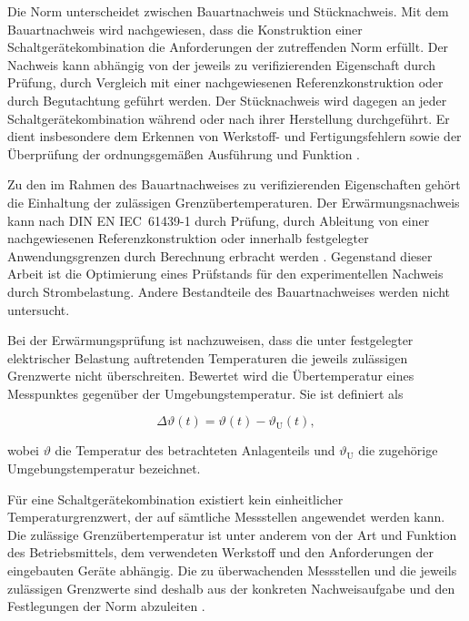 Die Norm unterscheidet zwischen Bauartnachweis und Stücknachweis. Mit dem
Bauartnachweis wird nachgewiesen, dass die Konstruktion einer
Schaltgerätekombination die Anforderungen der zutreffenden Norm erfüllt. Der
Nachweis kann abhängig von der jeweils zu verifizierenden Eigenschaft durch
Prüfung, durch Vergleich mit einer nachgewiesenen Referenzkonstruktion oder
durch Begutachtung geführt werden. Der Stücknachweis wird dagegen an jeder
Schaltgerätekombination während oder nach ihrer Herstellung durchgeführt. Er
dient insbesondere dem Erkennen von Werkstoff- und Fertigungsfehlern sowie der
Überprüfung der ordnungsgemäßen Ausführung und Funktion
\parencite[Abschn.~3.9.1 und 3.9.2]{din_en_61439_1}.

Zu den im Rahmen des Bauartnachweises zu verifizierenden Eigenschaften gehört
die Einhaltung der zulässigen Grenzübertemperaturen. Der Erwärmungsnachweis
kann nach DIN EN IEC~61439-1 durch Prüfung, durch Ableitung von einer
nachgewiesenen Referenzkonstruktion oder innerhalb festgelegter
Anwendungsgrenzen durch Berechnung erbracht werden
\parencite[Abschn.~10.10.1]{din_en_61439_1}. Gegenstand dieser Arbeit ist die
Optimierung eines Prüfstands für den experimentellen Nachweis durch
Strombelastung. Andere Bestandteile des Bauartnachweises werden nicht
untersucht.

Bei der Erwärmungsprüfung ist nachzuweisen, dass die unter festgelegter
elektrischer Belastung auftretenden Temperaturen die jeweils zulässigen
Grenzwerte nicht überschreiten. Bewertet wird die Übertemperatur eines
Messpunktes gegenüber der Umgebungstemperatur. Sie ist definiert als

\begin{equation}
  \Delta\vartheta(t)
  =
  \vartheta(t)-\vartheta_{\mathrm{U}}(t),
  \label{eq:uebertemperatur}
\end{equation}

wobei \(\vartheta\) die Temperatur des betrachteten Anlagenteils und
\(\vartheta_{\mathrm{U}}\) die zugehörige Umgebungstemperatur bezeichnet.

Für eine Schaltgerätekombination existiert kein einheitlicher
Temperaturgrenzwert, der auf sämtliche Messstellen angewendet werden kann. Die
zulässige Grenzübertemperatur ist unter anderem von der Art und Funktion des
Betriebsmittels, dem verwendeten Werkstoff und den Anforderungen der
eingebauten Geräte abhängig. Die zu überwachenden Messstellen und die jeweils
zulässigen Grenzwerte sind deshalb aus der konkreten Nachweisaufgabe und den
Festlegungen der Norm abzuleiten
\parencite[Abschn.~9.2 und Tab.~6]{din_en_61439_1}.

